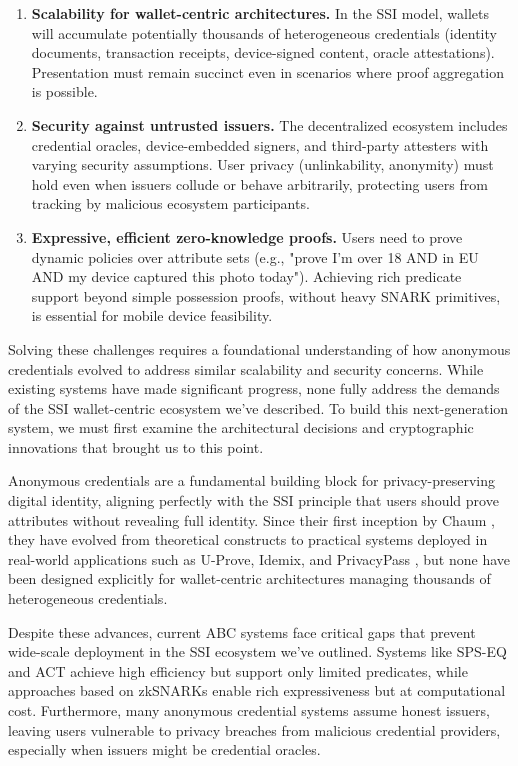 \begin{enumerate}
   \item \textbf{Scalability for wallet-centric architectures.} In the SSI model, wallets will accumulate potentially thousands of heterogeneous credentials (identity documents, transaction receipts, device-signed content, oracle attestations). Presentation must remain succinct even in scenarios where proof aggregation is possible.

    \item \textbf{Security against untrusted issuers.} The decentralized ecosystem includes credential oracles, device-embedded signers, and third-party attesters with varying security assumptions. User privacy (unlinkability, anonymity) must hold even when issuers collude or behave arbitrarily, protecting users from tracking by malicious ecosystem participants.

    \item \textbf{Expressive, efficient zero-knowledge proofs.} Users need to prove dynamic policies over attribute sets (e.g., "prove I'm over 18 AND in EU AND my device captured this photo today"). Achieving rich predicate support beyond simple possession proofs, without heavy SNARK primitives, is essential for mobile device feasibility.

\end{enumerate}

Solving these challenges requires a foundational understanding of how anonymous credentials evolved to address similar scalability and security concerns. While existing systems have made significant progress, none fully address the demands of the SSI wallet-centric ecosystem we've described. To build this next-generation system, we must first examine the architectural decisions and cryptographic innovations that brought us to this point.

Anonymous credentials are a fundamental building block for privacy-preserving digital identity, aligning perfectly with the SSI principle that users should prove attributes without revealing full identity. Since their first inception by Chaum \cite{chaum_untraceable_1981}, they have evolved from theoretical constructs to practical systems deployed in real-world applications such as U-Prove, Idemix, and PrivacyPass \cite{camenisch_design_2002, dunkelman_formal_2016}, but none have been designed explicitly for wallet-centric architectures managing thousands of heterogeneous credentials. 

Despite these advances, current ABC systems face critical gaps that prevent wide-scale deployment in the SSI ecosystem we've outlined.  Systems like SPS-EQ \cite{fuchsbauer_structure-preserving_2019, hanaoka_improved_2022} and ACT \cite{guo_anonymous_2023} achieve high efficiency but support only limited predicates, while approaches based on zkSNARKs enable rich expressiveness \cite{rosenberg_zk-creds_2022} but at computational cost. Furthermore, many anonymous credential systems assume honest issuers, leaving users vulnerable to privacy breaches from malicious credential providers, especially when issuers might be credential oracles.


